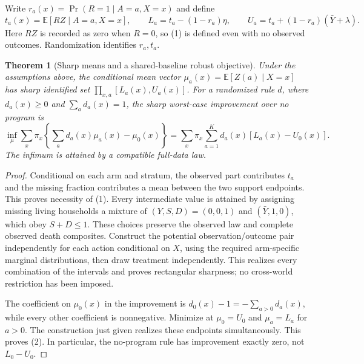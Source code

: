 \documentclass[11pt]{article}
\newtheorem{theorem}{Theorem}
\theoremstyle{definition}
\begin{document}
Write $r_a(x)=\Pr(R=1\mid A=a,X=x)$ and define
\[
 t_a(x)=\mathbb E[RZ\mid A=a,X=x],\qquad
 L_a=t_a-(1-r_a)\eta,\qquad
 U_a=t_a+(1-r_a)(\bar Y+\lambda).
 \tag{1}
\]
Here $RZ$ is recorded as zero when $R=0$, so (1) is defined even with no observed outcomes. Randomization identifies $r_a,t_a$.

\begin{theorem}[Sharp means and a shared-baseline robust objective]
Under the assumptions above, the conditional mean vector
$\mu_a(x)=\mathbb E[Z(a)\mid X=x]$ has sharp identified set
$\prod_{x,a}[L_a(x),U_a(x)]$.
For a randomized rule $d$, where $d_a(x)\geq0$ and $\sum_a d_a(x)=1$, the sharp worst-case improvement over no program is
\[
 \inf_{\mu}\sum_x\pi_x\left\{\sum_a d_a(x)\mu_a(x)-\mu_0(x)\right\}
 =\sum_x\pi_x\sum_{a=1}^K d_a(x)[L_a(x)-U_0(x)].
 \tag{2}
\]
The infimum is attained by a compatible full-data law.
\end{theorem}
\begin{proof}
Conditional on each arm and stratum, the observed part contributes $t_a$ and the missing fraction contributes a mean between the two support endpoints. This proves necessity of (1). Every intermediate value is attained by assigning missing living households a mixture of $(Y,S,D)=(0,0,1)$ and $(\bar Y,1,0)$, which obey $S+D\leq1$. These choices preserve the observed law and complete observed death composites. Construct the potential observation/outcome pair independently for each action conditional on $X$, using the required arm-specific marginal distributions, then draw treatment independently. This realizes every combination of the intervals and proves rectangular sharpness; no cross-world restriction has been imposed.

The coefficient on $\mu_0(x)$ in the improvement is $d_0(x)-1=-\sum_{a>0}d_a(x)$, while every other coefficient is nonnegative. Minimize at $\mu_0=U_0$ and $\mu_a=L_a$ for $a>0$. The construction just given realizes these endpoints simultaneously. This proves (2). In particular, the no-program rule has improvement exactly zero, not $L_0-U_0$.
\end{proof}
\end{document}
